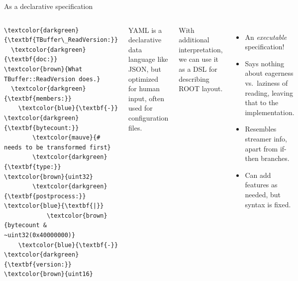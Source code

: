 \documentclass[aspectratio=169]{beamer}
\begin{document}
\begin{frame}[fragile]{As a declarative specification}
\begin{columns}
\begin{onlyenv}
\begin{Verbatim}[commandchars=\\\{\}]
\textcolor{darkgreen}{\textbf{TBuffer\_ReadVersion:}}
  \textcolor{darkgreen}{\textbf{doc:}} \textcolor{brown}{What TBuffer::ReadVersion does.}
  \textcolor{darkgreen}{\textbf{members:}}
    \textcolor{blue}{\textbf{-}} \textcolor{darkgreen}{\textbf{bytecount:}}
        \textcolor{mauve}{# needs to be transformed first}
        \textcolor{darkgreen}{\textbf{type:}} \textcolor{brown}{uint32}
        \textcolor{darkgreen}{\textbf{postprocess:}}  \textcolor{blue}{\textbf{|}}
            \textcolor{brown}{bytecount & ~uint32(0x40000000)}
    \textcolor{blue}{\textbf{-}} \textcolor{darkgreen}{\textbf{version:}} \textcolor{brown}{uint16}
\end{Verbatim}
\end{onlyenv}

YAML is a declarative data language like JSON, but optimized for human input, often used for configuration files.

\vspace{0.25 cm}
With additional interpretation, we can use it as a DSL for describing ROOT layout.
\begin{itemize}
\item An {\it executable} specification!
\item Says nothing about eagerness vs.\ laziness of reading, leaving that to the implementation.
\item Resembles streamer info, apart from if-then branches.
\item Can add features as needed, but syntax is fixed.
\end{itemize}
\end{columns}
\end{frame}
\end{document}
